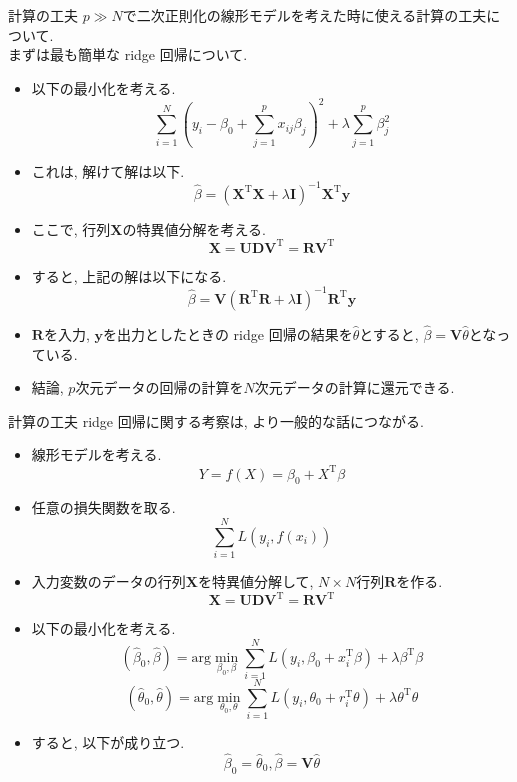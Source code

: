 \documentclass[dvipdfmx,8pt]{beamer}
\begin{document}
  \begin{frame}{計算の工夫}
    $p \gg N$で二次正則化の線形モデルを考えた時に使える計算の工夫について. \\
    まずは最も簡単な ridge 回帰について.
    \begin{itemize}
      \item 以下の最小化を考える.
        \[
          \sum_{i=1}^N\left(y_i-\beta_0+\sum_{j=1}^px_{ij}\beta_j\right) ^2+\lambda\sum_{j=1}^p\beta_j^2
        \]
      \item これは, 解けて解は以下.
        \[
          \hat{\beta}=(\textbf{X}^\mathrm{T}\textbf{X}+\lambda\textbf{I})^{-1}\textbf{X}^\mathrm{T}\textbf{y}
        \]
      \item ここで, 行列$\textbf{X}$の特異値分解を考える.
        \[
          \textbf{X}=\textbf{U}\textbf{D}\textbf{V}^{\mathrm{T}}=\textbf{R}\textbf{V}^{\mathrm{T}}
        \]
      \item すると, 上記の解は以下になる.
        \[
          \hat{\beta}=\textbf{V}(\textbf{R}^\mathrm{T}\textbf{R}+\lambda\textbf{I})^{-1}\textbf{R}^\mathrm{T}\textbf{y}
        \]
      \item $\textbf{R}$を入力, $\textbf{y}$を出力としたときの ridge 回帰の結果を$\hat{\theta}$とすると, $\hat{\beta}=\textbf{V}\hat{\theta}$となっている.
      \item 結論, $p$次元データの回帰の計算を$N$次元データの計算に還元できる.
    \end{itemize}
  \end{frame}
  \begin{frame}{計算の工夫}
    ridge 回帰に関する考察は, より一般的な話につながる.
    \begin{itemize}
      \item 線形モデルを考える.
        \[
          Y=f(X)=\beta_0+X^{\mathrm{T}}\beta
        \]
      \item 任意の損失関数を取る.
        \[
          \sum_{i=1}^NL(y_i,f(x_i))
        \]
      \item 入力変数のデータの行列$\textbf{X}$を特異値分解して, $N\times N$行列$\textbf{R}$を作る.
        \[
          \textbf{X}=\textbf{U}\textbf{D}\textbf{V}^{\mathrm{T}}=\textbf{R}\textbf{V}^{\mathrm{T}}
        \]
      \item 以下の最小化を考える.
        \[
          (\hat{\beta}_0,\hat{\beta})=\mathrm{arg}\min_{\beta_0,\beta}\sum_{i=1}^NL(y_i,\beta_0+x_i^\mathrm{T}\beta)+\lambda\beta^\mathrm{T}\beta
        \]
        \[
          (\hat{\theta}_0,\hat{\theta})=\mathrm{arg}\min_{\theta_0,\theta}\sum_{i=1}^NL(y_i,\theta_0+r_i^\mathrm{T}\theta)+\lambda\theta^\mathrm{T}\theta
        \]
      \item すると, 以下が成り立つ.
        \[
          \hat{\beta}_0=\hat{\theta}_0,\hat{\beta}=\textbf{V}\hat{\theta}
        \]
    \end{itemize}
  \end{frame}
\end{document}
